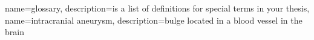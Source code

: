 {
  name={glossary},
  description={is a list of definitions for special terms in your thesis},
  name={intracranial aneurysm},
  description={bulge located in a blood vessel in the brain}
}
